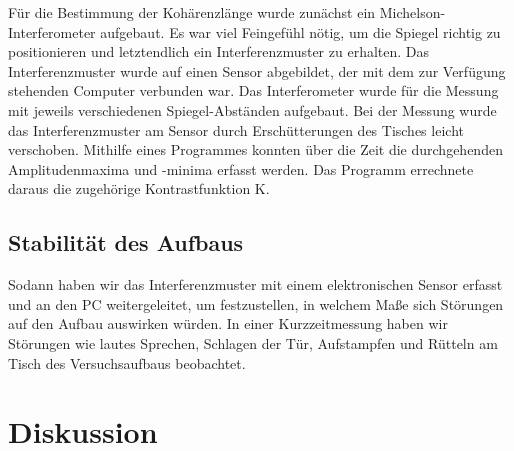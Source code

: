 \documentclass[10pt,a4paper]{article}
\begin{document}
Für die Bestimmung der Kohärenzlänge wurde zunächst ein Michelson-Interferometer aufgebaut. Es war viel Feingefühl nötig, um die Spiegel richtig zu positionieren und letztendlich ein Interferenzmuster zu erhalten. Das Interferenzmuster wurde auf einen Sensor abgebildet, der mit dem zur Verfügung stehenden Computer verbunden war. Das Interferometer wurde für die Messung mit jeweils verschiedenen Spiegel-Abständen aufgebaut. Bei der Messung wurde das Interferenzmuster am Sensor durch Erschütterungen des Tisches leicht verschoben. Mithilfe eines Programmes konnten über die Zeit die durchgehenden Amplitudenmaxima und -minima erfasst werden. Das Programm errechnete daraus die zugehörige Kontrastfunktion K. 


\subsection{Stabilität des Aufbaus}

Sodann haben wir das Interferenzmuster mit einem elektronischen Sensor erfasst und an den PC weitergeleitet, um festzustellen, in welchem Maße sich Störungen auf den Aufbau auswirken würden. In einer Kurzzeitmessung haben wir Störungen wie lautes Sprechen, Schlagen der Tür, Aufstampfen und Rütteln am Tisch des Versuchsaufbaus beobachtet.

\section{Diskussion}


\end{document}
